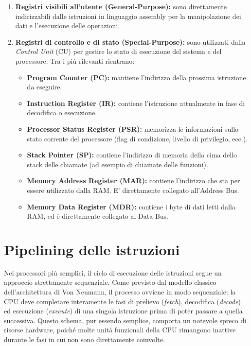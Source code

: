 \documentclass[12pt]{report}
\begin{document}
	\begin{enumerate}
		\item \textbf{Registri visibili all'utente (General-Purpose):} sono direttamente indirizzabili dalle istruzioni in linguaggio assembly per la manipolazione dei dati e l'esecuzione delle operazioni.
		
		\item \textbf{Registri di controllo e di stato (Special-Purpose):} sono utilizzati dalla \textit{Control Unit} (CU) per gestire lo stato di esecuzione del sistema e del processore. Tra i più rilevanti rientrano:
		\begin{itemize}
			\item \textbf{Program Counter (PC):} mantiene l'indirizzo della prossima istruzione da eseguire.
			
			\item \textbf{Instruction Register (IR):} contiene l'istruzione attualmente in fase di decodifica o esecuzione.
			
			\item \textbf{Processor Status Register (PSR):} memorizza le informazioni sullo stato corrente del processore (flag di condizione, livello di privilegio, ecc.).
			
			\item \textbf{Stack Pointer (SP):} contiene l'indirizzo di memoria della cima dello stack delle chiamate (ad esempio di chiamate delle funzioni).
			
			\item \textbf{Memory Address Register (MAR):} contiene l'indirizzo che sta per essere utilizzato dalla RAM. E' direttamente collegato all'Address Bus.
			
			\item \textbf{Memory Data Register (MDR):} contiene i byte di dati letti dalla RAM, ed è direttamente collegato al Data Bus.
			
		\end{itemize}
	\end{enumerate}
	
	\section{Pipelining delle istruzioni}
	
	Nei processori più semplici, il ciclo di esecuzione delle istruzioni segue un approccio strettamente sequenziale. Come previsto dal modello classico dell'architettura di Von Neumann, il processo avviene in modo sequenziale: la CPU deve completare interamente le fasi di prelievo (\textit{fetch}), decodifica (\textit{decode}) ed esecuzione (\textit{execute}) di una singola istruzione prima di poter passare a quella successiva. Questo schema, pur essendo semplice, comporta un notevole spreco di risorse hardware, poiché molte unità funzionali della CPU rimangono inattive durante le fasi in cui non sono direttamente coinvolte.
	
\end{document}
